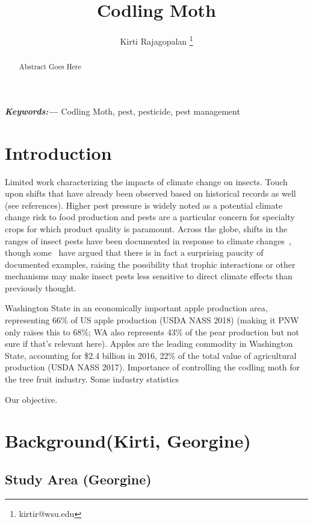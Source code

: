 \documentclass[12pt]{article}
\title{\textbf{Codling Moth}}
\author[1]{Kirti Rajagopalan \thanks{kirtir@wsu.edu}}
\affil[1]{CAHNR, Washington State University}
\date{}
\theoremstyle{plain}
\theoremstyle{definition}
\theoremstyle{definition}
\providecommand{\keywords}[1]{\textbf{\textit{Keywords:---}} #1}
\providecommand{\keywords}[1]{\textbf{\textit{Keywords:}} #1}
\begin{document}
 

\maketitle

\begin{abstract}
  Abstract Goes Here
\end{abstract}


\keywords{Codling Moth, pest, pesticide, pest management}

\section{Introduction}

Limited work characterizing the impacts of climate change on insects.
Touch upon shifts that have already been observed based on historical records as well (see references).
Higher pest pressure is widely noted as a potential climate change risk to food production  and pests are a particular concern for specialty crops for which product quality is paramount.
Across the globe, shifts in the ranges of insect pests have been documented in response to climate changes~\cite{Bebber_2013, Parmesan_Camille, Jaramillo_2009}, though some~\cite{Battisti_Andrea} have argued that there is in fact a surprising paucity of documented examples, raising the possibility that trophic interactions or other mechanisms may make insect pests less sensitive to direct climate effects than previously thought.

Washington State in an economically important apple production area, representing 66\% of US apple production (USDA NASS 2018) (making it PNW only raises this to $68\%$; WA also represents 43\% of the pear production but not sure if that’s relevant here). Apples are the leading commodity in Washington State, accounting for \$2.4 billion in 2016, 22\% of the total value of agricultural production (USDA NASS 2017).
	Importance of controlling the codling moth for the tree fruit industry. Some industry statistics

Our objective.

\section{Background(Kirti, Georgine)}


\subsection{Study Area (Georgine)}
\end{document}
